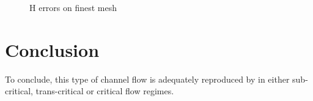 \begin{figure}[H]
\centering
  \caption{H errors on finest mesh}
\label{fig:bumpcri:ErrNumH_convergence_mesh3}
\end{figure}


\section{Conclusion}

To conclude, this type of channel flow is adequately reproduced by
 in either sub-critical, trans-critical or critical flow regimes.



